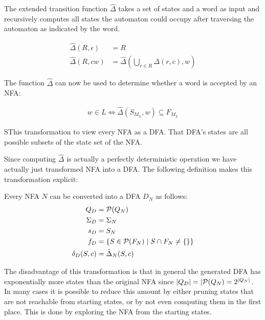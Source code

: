 \begin{definition}
    The extended transition function $\hat\Delta$ takes a set of states and a
    word as input and recursively computes all states the automaton could occupy
    after traversing the automaton as indicated by the word.

    \begin{align}
        \hat\Delta(R, \epsilon) &= R \\
        \hat\Delta(R, c w) &= \hat\Delta(\bigcup\limits_{r \in R} \Delta(r, c), w)
    \end{align}
\end{definition}

The function $\hat\Delta$ can now be used to determine whether a word is accepted by an NFA:

\begin{align}
    w \in L \Leftrightarrow \hat\Delta(S_{M_L}, w) \subseteq F_{M_L}
\end{align}

SThis transformation to view every NFA as a DFA.
That DFA's states are all possible subsets of the state set of the NFA.

Since computing $\hat\Delta$ is actually a perfectly deterministic operation
we have actually just transformed NFA into a DFA.
The following definition makes this transformation explicit:

\begin{definition}
    Every NFA $N$ can be converted into a DFA $D_N$ as follows:
    \begin{align}
        Q_D &= \mathcal{P}(Q_N) \\
        \Sigma_D &= \Sigma_N \\
        s_D &= S_N \\
        f_D &= \{ S \in \mathcal{P}(F_N) \mid S \cap F_N \neq \{\} \} \\
        \delta_D(S, c) &= \hat\Delta_N(S, c)
    \end{align}
\end{definition}

The disadvantage of this transformation is that
in general the generated DFA has exponentially more states
than the original NFA since $|Q_D| = |\mathcal{P}(Q_N) = 2^{|Q_N|}$.
In many cases it is possible to reduce this amount by either pruning states
that are not reachable from starting states,
or by not even computing them in the first place.
This is done by exploring the NFA from the starting states.
